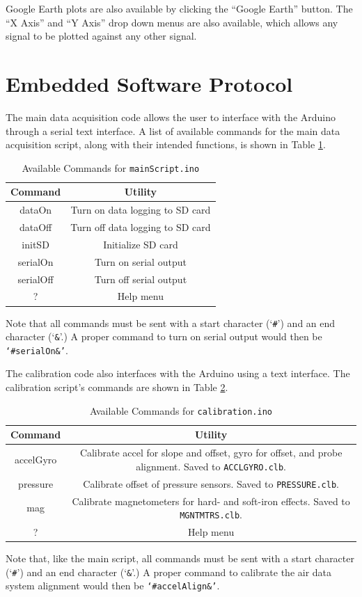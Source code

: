 Google Earth plots are also available by clicking the ``Google Earth'' button. The ``X Axis'' and ``Y Axis'' drop down menus are also available, which allows any signal to be plotted against any other signal.

\section{Embedded Software Protocol}
The main data acquisition code allows the user to interface with the Arduino through a serial text interface. A list of available commands for the main data acquisition script, along with their intended functions, is shown in Table \ref{table:mainScriptComms}.
\begin{table}[H]
\caption{Available Commands for \texttt{mainScript.ino}}
\centering
\begin{tabular}{|c | c|}
\hline
 Command & Utility\\
 \hline\hline
dataOn & Turn on data logging to SD card\\\hline
dataOff & Turn off data logging to SD card\\\hline
initSD & Initialize SD card\\\hline
serialOn & Turn on serial output\\\hline
serialOff & Turn off serial output\\\hline
? & Help menu\\\hline
\end{tabular}
\label{table:mainScriptComms}
\end{table}

Note that all commands must be sent with a start character (`\texttt{\#}') and an end character (`\texttt{\&}'.) A proper command to turn on serial output would then be \texttt{`\#serialOn\&'}.

The calibration code also interfaces with the Arduino using a text interface. The calibration script's commands are shown in Table \ref{table:calibComms}.
\begin{table}[H]
\caption{Available Commands for \texttt{calibration.ino}}
\centering
\begin{tabular}{|c | c|}
\hline
 Command & Utility\\
 \hline\hline
accelGyro & Calibrate accel for slope and offset, gyro for offset, and probe alignment. 
Saved to \texttt{ACCLGYRO.clb}.\\\hline
pressure & Calibrate offset of pressure sensors. 
Saved to \texttt{PRESSURE.clb}.\\\hline
mag & Calibrate magnetometers for hard- and soft-iron effects. 
Saved to \texttt{MGNTMTRS.clb}.\\\hline
? & Help menu\\\hline
\end{tabular}
\label{table:calibComms}
\end{table}

Note that, like the main script, all commands must be sent with a start character (`\texttt{\#}') and an end character (`\texttt{\&}'.) A proper command to calibrate the air data system alignment would then be \texttt{`\#accelAlign\&'}.
